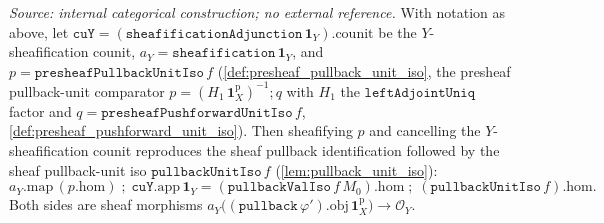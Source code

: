 \begin{lemma}\leanok
  \label{lem:presheaf_pullback_unit_iso_sheafify_reconcile}
  \textit{Source: internal categorical construction; no external reference.}
  With notation as above, let \(\mathtt{cuY} = (\mathtt{sheafificationAdjunction}\,\mathbf 1_Y).\mathrm{counit}\)
  be the $Y$-sheafification counit, \(a_Y = \mathtt{sheafification}\,\mathbf 1_Y\), and
  \(p = \mathtt{presheafPullbackUnitIso}\,f\) (\cref{def:presheaf_pullback_unit_iso}, the presheaf
  pullback-unit comparator \(p = (H_1\,\mathbf 1^{\mathrm p}_X)^{-1} \mathbin{;} q\) with \(H_1\) the
  \(\mathtt{leftAdjointUniq}\) factor and \(q = \mathtt{presheafPushforwardUnitIso}\,f\),
  \cref{def:presheaf_pushforward_unit_iso}). Then sheafifying \(p\) and cancelling the
  $Y$-sheafification counit reproduces the sheaf pullback identification followed by the sheaf
  pullback-unit iso \(\mathtt{pullbackUnitIso}\,f\) (\cref{lem:pullback_unit_iso}):
  \[
    a_Y.\mathrm{map}\,(p.\mathrm{hom}) \;\mathbin{;}\; \mathtt{cuY}.\mathrm{app}\,\mathbf 1_Y
      = (\mathtt{pullbackValIso}\,f\,M_0).\mathrm{hom}
        \;\mathbin{;}\; (\mathtt{pullbackUnitIso}\,f).\mathrm{hom}.
  \]
  Both sides are sheaf morphisms
  \(a_Y\bigl((\mathtt{pullback}\,\varphi').\mathrm{obj}\,\mathbf 1^{\mathrm p}_X\bigr) \to \mathcal O_Y\).
\end{lemma}
